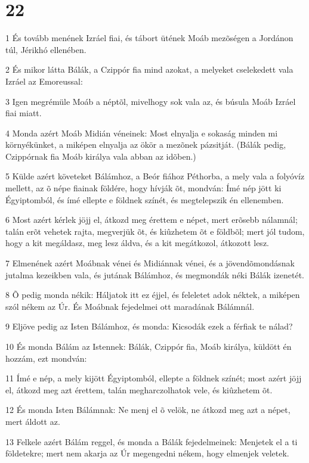 \chapter{22}

\par 1 És tovább menének Izráel fiai, és tábort ütének Moáb mezõségen a Jordánon túl, Jérikhó ellenében.
\par 2 És mikor látta Bálák, a Czippór fia mind azokat, a melyeket cselekedett vala Izráel az Emoreussal:
\par 3 Igen megrémüle Moáb a néptõl, mivelhogy sok vala az, és búsula Moáb Izráel fiai miatt.
\par 4 Monda azért Moáb Midián véneinek: Most elnyalja e sokaság minden mi környékünket, a miképen elnyalja az ökör a mezõnek pázsitját. (Bálák pedig, Czippórnak fia Moáb királya vala abban az idõben.)
\par 5 Külde azért követeket Bálámhoz, a Beór fiához Péthorba, a mely vala a folyóvíz mellett, az õ népe fiainak földére, hogy hívják õt, mondván: Ímé nép jött ki Égyiptomból, és ímé ellepte e földnek színét, és megtelepszik én ellenemben.
\par 6 Most azért kérlek jöjj el, átkozd meg érettem e népet, mert erõsebb nálamnál; talán erõt vehetek rajta, megverjük õt, és kiûzhetem õt e földbõl; mert jól tudom, hogy a kit megáldasz, meg lesz áldva, és a kit megátkozol, átkozott lesz.
\par 7 Elmenének azért Moábnak vénei és Midiánnak vénei, és a jövendõmondásnak jutalma kezeikben vala, és jutának Bálámhoz, és megmondák néki Bálák izenetét.
\par 8 Õ pedig monda nékik: Háljatok itt ez éjjel, és feleletet adok néktek, a miképen szól nékem az Úr. És Moábnak fejedelmei ott maradának Bálámnál.
\par 9 Eljöve pedig az Isten Bálámhoz, és monda: Kicsodák ezek a férfiak te nálad?
\par 10 És monda Bálám az Istennek: Bálák, Czippór fia, Moáb királya, küldött én hozzám, ezt mondván:
\par 11 Ímé e nép, a mely kijött Égyiptomból, ellepte a földnek színét; most azért jöjj el, átkozd meg azt érettem, talán megharczolhatok vele, és kiûzhetem õt.
\par 12 És monda Isten Bálámnak: Ne menj el õ velök, ne átkozd meg azt a népet, mert áldott az.
\par 13 Felkele azért Bálám reggel, és monda a Bálák fejedelmeinek: Menjetek el a ti földetekre; mert nem akarja az Úr megengedni nékem, hogy elmenjek veletek.
